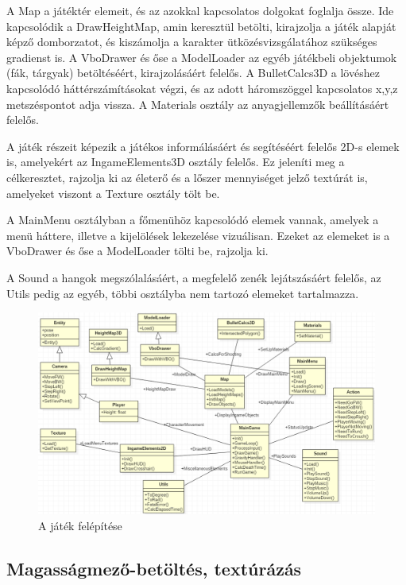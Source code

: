 A Map a játéktér elemeit, és az azokkal kapcsolatos dolgokat foglalja össze. Ide kapcsolódik a DrawHeightMap, amin keresztül betölti, kirajzolja a játék alapját képző domborzatot, és kiszámolja a karakter ütközésvizsgálatához szükséges gradienst is. A VboDrawer és őse a ModelLoader az egyéb játékbeli objektumok (fák, tárgyak) betöltéséért, kirajzolásáért felelős. A BulletCalcs3D a lövéshez kapcsolódó háttérszámításokat végzi, és az adott háromszöggel kapcsolatos x,y,z metszéspontot adja vissza. A Materials osztály az anyagjellemzők beállításáért felelős.

A játék részeit képezik a játékos informálásáért és segítéséért felelős 2D-s elemek is, amelyekért az IngameElements3D osztály felelős. Ez jeleníti meg a célkeresztet, rajzolja ki az életerő és a lőszer mennyiséget jelző textúrát is, amelyeket viszont a Texture osztály tölt be.

A MainMenu osztályban a főmenühöz kapcsolódó elemek vannak, amelyek a menü háttere, illetve a kijelölések lekezelése vizuálisan. Ezeket az elemeket is a VboDrawer és őse a ModelLoader tölti be, rajzolja ki.

A Sound a hangok megszólalásáért, a megfelelő zenék lejátszásáért felelős, az Utils pedig az egyéb, többi osztályba nem tartozó elemeket tartalmazza.

\begin{figure}[h]
\centering
\includegraphics[scale=0.5]{kepek/uml.png}
\caption{A játék felépítése}
\label{fig:uml}
\end{figure}

\subsection{Magasságmező-betöltés, textúrázás}

